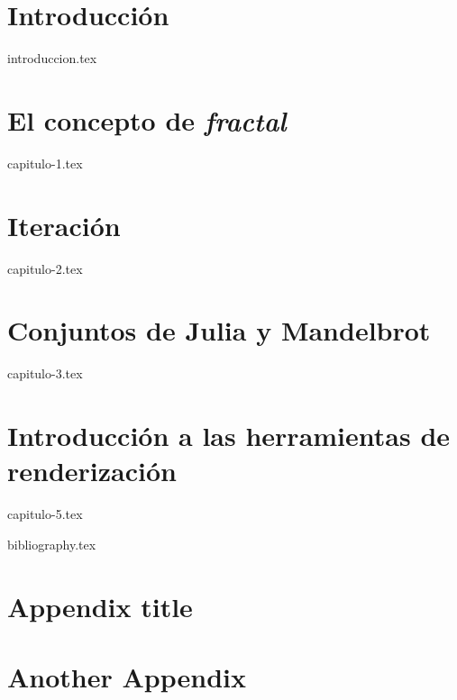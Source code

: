 \documentclass[11pt]{report}
\begin{document}
\chapter*{Introducción}
\setcounter{page}{1}


{introduccion.tex}


\chapter{El concepto de \textit{fractal}}
\label{chap:concepto}

{capitulo-1.tex}

\chapter{Iteración}
\label{chap:iteracion}

{capitulo-2.tex}


\chapter{Conjuntos de Julia y Mandelbrot}
\label{chap:Julia-Mandelbrot}

{capitulo-3.tex}

\chapter{Introducción a las herramientas de renderización}
\label{chap:renderizacion}

{capitulo-5.tex}


{bibliography.tex}



\appendix
\cleardoublepage


\chapter{Appendix title}

\chapter{Another Appendix}
\end{document}
